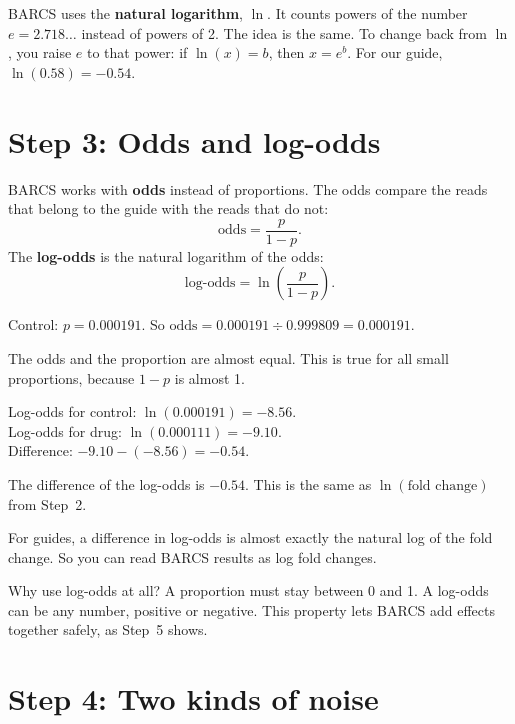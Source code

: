 \documentclass[12pt]{article}
\begin{document}
BARCS uses the \textbf{natural logarithm}, $\ln$. It counts powers of the
number $e = 2.718\ldots$ instead of powers of 2. The idea is the same. To
change back from $\ln$, you raise $e$ to that power: if $\ln(x) = b$, then
$x = e^{b}$. For our guide, $\ln(0.58) = -0.54$.

\section{Step 3: Odds and log-odds}

BARCS works with \textbf{odds} instead of proportions. The odds compare the
reads that belong to the guide with the reads that do not:
\[
\text{odds} = \frac{p}{1-p}.
\]
The \textbf{log-odds} is the natural logarithm of the odds:
\[
\text{log-odds} = \ln\!\left(\frac{p}{1-p}\right).
\]

\begin{worked}
Control: $p = 0.000191$. So
$\text{odds} = 0.000191 \div 0.999809 = 0.000191$.

The odds and the proportion are almost equal. This is true for all small
proportions, because $1-p$ is almost 1.

Log-odds for control: $\ln(0.000191) = -8.56$.\\
Log-odds for drug: $\ln(0.000111) = -9.10$.\\
Difference: $-9.10 - (-8.56) = -0.54$.

The difference of the log-odds is $-0.54$. This is the same as
$\ln(\text{fold change})$ from Step~2.
\end{worked}

\begin{remember}
For guides, a difference in log-odds is almost exactly the natural log of
the fold change. So you can read BARCS results as log fold changes.
\end{remember}

Why use log-odds at all? A proportion must stay between 0 and 1. A log-odds
can be any number, positive or negative. This property lets BARCS add
effects together safely, as Step~5 shows.

\section{Step 4: Two kinds of noise}
\end{document}

